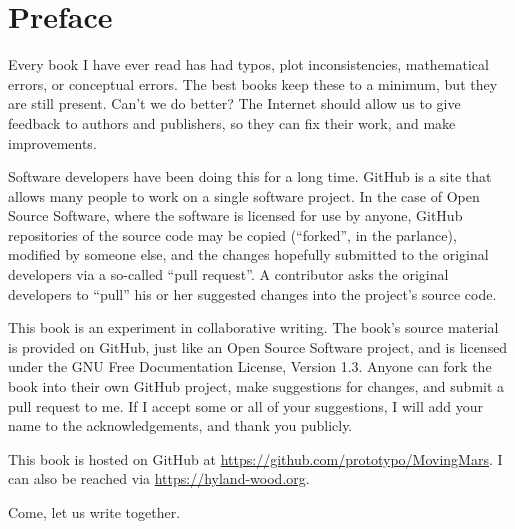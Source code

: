 % 
% 

\chapter*{Preface}

Every book I have ever read has had typos, plot inconsistencies, mathematical errors, or conceptual errors. The best books keep these to a minimum, but they are still present. Can't we do better? The Internet should allow us to give feedback to authors and publishers, so they can fix their work, and make improvements.

Software developers have been doing this for a long time. GitHub is a site that allows many people to work on a single software project. In the case of Open Source Software, where the software is licensed for use by anyone, GitHub repositories of the source code may be copied (``forked'', in the parlance), modified by someone else, and the changes hopefully submitted to the original developers via a so-called ``pull request''. A contributor asks the original developers to ``pull'' his or her suggested changes into the project's source code.

This book is an experiment in collaborative writing. The book's source material is provided on GitHub, just like an Open Source Software project, and is licensed under the GNU Free Documentation License, Version 1.3. Anyone can fork the book into their own GitHub project, make suggestions for changes, and submit a pull request to me. If I accept some or all of your suggestions, I will add your name to the acknowledgements, and thank you publicly.

This book is hosted on GitHub at \url{https://github.com/prototypo/MovingMars}. I can also be reached via \url{https://hyland-wood.org}.

Come, let us write together.




\newpage
\thispagestyle{empty}

